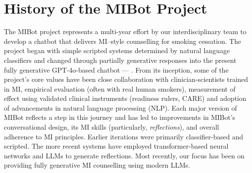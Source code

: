 \chapter{History of the MIBot Project}

\label{app:mibot_version_list}

\noindent The MIBot project represents a multi-year effort by our interdisciplinary team to develop a chatbot that delivers MI–style counselling for smoking cessation. The project began with simple scripted systems determined by natural language classifiers and changed through partially generative responses into the present fully generative GPT-4o-based chatbot --- \sysnamewithv. From its inception, some of the project's core values have been close collaboration with clinician-scientists trained in MI, empirical evaluation (often with real human smokers), measurement of effect using validated clinical instruments (readiness rulers, CARE) and adoption of advancements in natural language processing (NLP). Each major version of MIBot reflects a step in this journey and has led to improvements in MIBot's conversational design, its MI skills (particularly, \textit{reflections}), and overall adherence to MI principles. Earlier iterations were primarily classifier-based and scripted. The more recent systems have employed transformer-based neural networks and LLMs to generate reflections. Most recently, our focus has been on providing fully generative MI counselling using modern LLMs.

